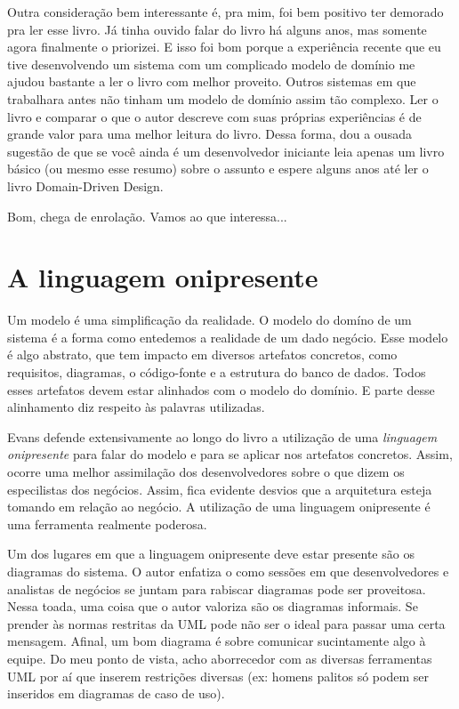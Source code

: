 \documentclass[a4paper, 12pt]{article}
\begin{document}
Outra consideração bem interessante é, pra mim, foi bem positivo ter demorado pra ler esse livro. Já tinha ouvido falar do livro há alguns anos, mas somente agora finalmente o priorizei. E isso foi bom porque a experiência recente que eu tive desenvolvendo um sistema com um complicado modelo de domínio me ajudou bastante a ler o livro com melhor proveito. Outros sistemas em que trabalhara antes não tinham um modelo de domínio assim tão complexo. Ler o livro e comparar o que o autor descreve com suas próprias experiências é de grande valor para uma melhor leitura do livro. Dessa forma, dou a ousada sugestão de que se você ainda é um desenvolvedor iniciante leia apenas um livro básico (ou mesmo esse resumo) sobre o assunto e espere alguns anos até ler o livro Domain-Driven Design.

Bom, chega de enrolação. Vamos ao que interessa...

\section{A linguagem onipresente}

Um modelo é uma simplificação da realidade. O modelo do domíno de um sistema é a forma como entedemos a realidade de um dado negócio. Esse modelo é algo abstrato, que tem impacto em diversos artefatos concretos, como requisitos, diagramas, o código-fonte e a estrutura do banco de dados. Todos esses artefatos devem estar alinhados com o modelo do domínio. E parte desse alinhamento diz respeito às palavras utilizadas. 

Evans defende extensivamente ao longo do livro a utilização de uma \emph{linguagem onipresente} para falar do modelo e para se aplicar nos artefatos concretos. Assim, ocorre uma melhor assimilação dos desenvolvedores sobre o que dizem os especilistas dos negócios. Assim, fica evidente desvios que a arquitetura esteja tomando em relação ao negócio. A utilização de uma linguagem onipresente é uma ferramenta realmente poderosa.

Um dos lugares em que a linguagem onipresente deve estar presente são os diagramas do sistema. O autor enfatiza o como sessões em que desenvolvedores e analistas de negócios se juntam para rabiscar diagramas pode ser proveitosa. Nessa toada, uma coisa que o autor valoriza são os diagramas informais. Se prender às normas restritas da UML pode não ser o ideal para passar uma certa mensagem. Afinal, um bom diagrama é sobre comunicar sucintamente algo à equipe. Do meu ponto de vista, acho aborrecedor com as diversas ferramentas UML por aí que inserem restrições diversas (ex: homens palitos só podem ser inseridos em diagramas de caso de uso).
\end{document}
